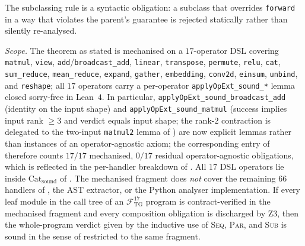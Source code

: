\noindent The subclassing rule is a syntactic obligation: a
subclass that overrides \texttt{forward} in a way that violates
the parent's guarantee is rejected statically rather than
silently re-analysed.

\begin{theorem}\label{thm:ag-sound}
\emph{Scope.} The theorem as stated is mechanised on a
$17$-operator DSL covering \texttt{matmul}, \texttt{view},
\texttt{add}/\texttt{broadcast\_add}, \texttt{linear},
\texttt{transpose}, \texttt{permute}, \texttt{relu},
\texttt{cat}, \texttt{sum\_reduce}, \texttt{mean\_reduce},
\texttt{expand}, \texttt{gather}, \texttt{embedding},
\texttt{conv2d}, \texttt{einsum}, \texttt{unbind}, and
\texttt{reshape}; all $17$ operators carry a
per-operator \texttt{applyOpExt\_sound\_*} lemma closed
sorry-free in Lean~$4$. In particular,
\texttt{applyOpExt\_sound\_broadcast\_add} (identity on the
input shape) and \texttt{applyOpExt\_sound\_matmul} (success
implies input rank $\ge 3$ and verdict equals input shape;
the rank-$2$ contraction is delegated to the two-input
\texttt{matmul2} lemma of ) are now
explicit lemmas rather than instances of an operator-agnostic
axiom; the corresponding entry of
 therefore counts $17/17$
mechanised, $0/17$ residual operator-agnostic obligations,
which is reflected in the per-handler breakdown of
. All $17$ DSL operators
lie inside $\mathrm{Cat}_{\mathrm{sound}}$ of
. The mechanised fragment does \emph{not} cover the
remaining $66$ handlers of , the
AST extractor, or the Python analyser implementation.
If every leaf module in the call tree of an
$\mathcal{F}_{\mathrm{TG}}^{17}$ program is contract-verified
in the mechanised fragment and every composition obligation
is discharged by Z3, then the whole-program verdict given by
the inductive use of \textsc{Seq}, \textsc{Par}, and
\textsc{Sub} is sound in the sense of 
restricted to the same fragment.
\end{theorem}

